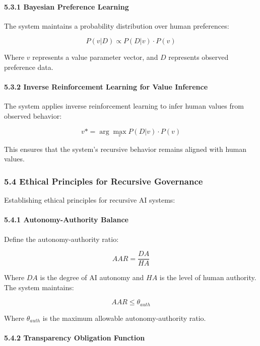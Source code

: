 \documentclass[
]{article}
\begin{document}
\paragraph{5.3.1 Bayesian Preference
Learning}\label{bayesian-preference-learning}

The system maintains a probability distribution over human preferences:

\[P(v | D) \propto P(D | v) \cdot P(v)\]

Where \(v\) represents a value parameter vector, and \(D\) represents
observed preference data.

\paragraph{5.3.2 Inverse Reinforcement Learning for Value
Inference}\label{inverse-reinforcement-learning-for-value-inference}

The system applies inverse reinforcement learning to infer human values
from observed behavior:

\[v* = \arg\max_v P(D | v) \cdot P(v)\]

This ensures that the system's recursive behavior remains aligned with
human values.

\subsubsection{5.4 Ethical Principles for Recursive
Governance}\label{ethical-principles-for-recursive-governance}

Establishing ethical principles for recursive AI systems:

\paragraph{5.4.1 Autonomy-Authority
Balance}\label{autonomy-authority-balance}

Define the autonomy-authority ratio:

\[AAR = \frac{DA}{HA}\]

Where \(DA\) is the degree of AI autonomy and \(HA\) is the level of
human authority. The system maintains:

\[AAR \leq \theta_{auth}\]

Where \(\theta_{auth}\) is the maximum allowable autonomy-authority
ratio.

\paragraph{5.4.2 Transparency Obligation
Function}\label{transparency-obligation-function}
\end{document}
